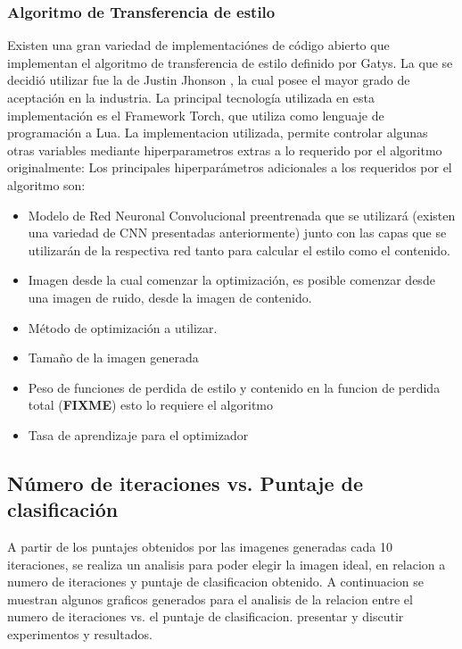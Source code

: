 \documentclass[a4paper,11pt,spanish]{book}
\newcommand*{\FIXME}[1]{{(\textbf{FIXME}) {#1}}}
\begin{document}
      \subsubsection{Algoritmo de Transferencia de estilo}
	Existen una gran variedad de implementaciónes de código abierto que implementan el algoritmo de transferencia de estilo definido por Gatys.
	La que se decidió utilizar fue la de Justin Jhonson \cite{Johnson:Neural_Style}, la cual posee el mayor grado de aceptación en la industria.
	La principal tecnología utilizada en esta implementación es el Framework Torch, que utiliza como lenguaje de programación a Lua.
	La implementacion  utilizada, permite controlar algunas otras variables mediante hiperparametros extras a lo requerido por el algoritmo originalmente:
	Los principales hiperparámetros adicionales a los requeridos por el algoritmo son:
	\begin{itemize}
	  \item Modelo de Red Neuronal Convolucional preentrenada que se utilizará (existen una variedad de CNN presentadas anteriormente) junto con las capas que se utilizarán de la
	  respectiva red tanto para calcular el estilo como el contenido.
	  \item Imagen desde la cual comenzar la optimización, es posible comenzar desde una imagen de ruido, desde la imagen de contenido.
	  \item Método de optimización a utilizar.
	  \item Tamaño de la imagen generada
	  \item Peso de funciones de perdida de estilo y contenido en la funcion de perdida total \FIXME{esto lo requiere el algoritmo}
	  \item Tasa de aprendizaje para el optimizador
	\end{itemize}


    \subsection{Número de iteraciones vs. Puntaje de clasificación}
      A partir de los puntajes obtenidos por las imagenes generadas cada 10 iteraciones, se realiza un analisis para poder elegir la imagen ideal, en relacion a numero de iteraciones y puntaje
      de clasificacion obtenido.
      A continuacion se muestran algunos graficos generados para el analisis de la relacion entre el numero de iteraciones vs. el puntaje de clasificacion.
      presentar y discutir experimentos y resultados.
      
\end{document}

